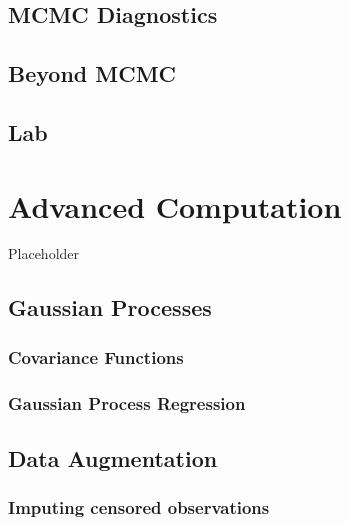 \documentclass[
]{book}
\begin{document}
\hypertarget{mcmc-diagnostics-1}{%
\section{MCMC Diagnostics}\label{mcmc-diagnostics-1}}

\hypertarget{beyond-mcmc-1}{%
\section{Beyond MCMC}\label{beyond-mcmc-1}}

\hypertarget{lab-3}{%
\section{Lab}\label{lab-3}}

\hypertarget{advanced-computation}{%
\chapter{Advanced Computation}\label{advanced-computation}}

Placeholder

\hypertarget{gaussian-processes}{%
\section{Gaussian Processes}\label{gaussian-processes}}

\hypertarget{covariance-functions}{%
\subsection{Covariance Functions}\label{covariance-functions}}

\hypertarget{gaussian-process-regression}{%
\subsection{Gaussian Process Regression}\label{gaussian-process-regression}}

\hypertarget{data-augmentation}{%
\section{Data Augmentation}\label{data-augmentation}}

\hypertarget{imputing-censored-observations}{%
\subsection{Imputing censored observations}\label{imputing-censored-observations}}
\end{document}
